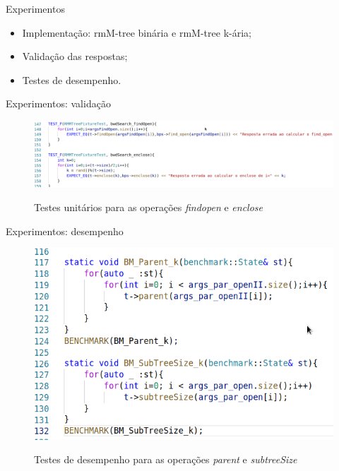\begin{frame}{Experimentos}
    \begin{itemize}
        \item Implementação: rmM-tree binária e rmM-tree k-ária;
        \item Validação das respostas;
        \item Testes de desempenho.
    \end{itemize}
\end{frame}



\begin{frame}{Experimentos: validação}
    
    \begin{figure}[h!]
        \centering
        \includegraphics[scale=0.25]{images/unit_tests.png}\\
        \caption{Testes unitários para as operações \textit{findopen} e \textit{enclose}}
    \end{figure} 
\end{frame}

\begin{frame}{Experimentos: desempenho}
    
    \begin{figure}[h!]
        \centering
        \includegraphics[scale=0.35]{images/benchmar.png}\\
        \caption{Testes de desempenho para as operações \textit{parent} e \textit{subtreeSize}}
    \end{figure} 
\end{frame}


